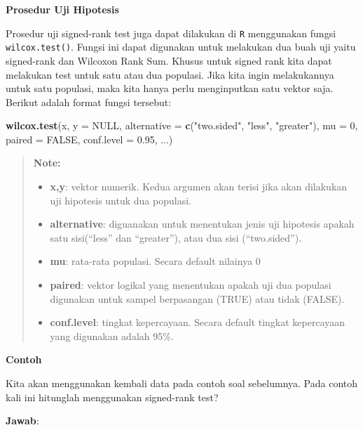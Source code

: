 \documentclass[]{book}
\newenvironment{Shaded}{\begin{snugshade}}{\end{snugshade}}
\newcommand{\KeywordTok}[1]{\textcolor[rgb]{0.13,0.29,0.53}{\textbf{#1}}}
\newcommand{\DataTypeTok}[1]{\textcolor[rgb]{0.13,0.29,0.53}{#1}}
\newcommand{\DecValTok}[1]{\textcolor[rgb]{0.00,0.00,0.81}{#1}}
\newcommand{\FloatTok}[1]{\textcolor[rgb]{0.00,0.00,0.81}{#1}}
\newcommand{\StringTok}[1]{\textcolor[rgb]{0.31,0.60,0.02}{#1}}
\newcommand{\OtherTok}[1]{\textcolor[rgb]{0.56,0.35,0.01}{#1}}
\newcommand{\NormalTok}[1]{#1}
\providecommand{\tightlist}{%
  \setlength{\itemsep}{0pt}\setlength{\parskip}{0pt}}
\begin{document}
\textbf{Prosedur Uji Hipotesis}

Prosedur uji signed-rank test juga dapat dilakukan di \texttt{R}
menggunakan fungsi \texttt{wilcox.test()}. Fungsi ini dapat digunakan
untuk melakukan dua buah uji yaitu signed-rank dan Wilcoxon Rank Sum.
Khusus untuk signed rank kita dapat melakukan test untuk satu atau dua
populasi. Jika kita ingin melakukannya untuk satu populasi, maka kita
hanya perlu menginputkan satu vektor saja. Berikut adalah format fungsi
tersebut:

\begin{Shaded}
\begin{Highlighting}[]
\KeywordTok{wilcox.test}\NormalTok{(x, }\DataTypeTok{y =} \OtherTok{NULL}\NormalTok{,}
            \DataTypeTok{alternative =} \KeywordTok{c}\NormalTok{(}\StringTok{"two.sided"}\NormalTok{, }\StringTok{"less"}\NormalTok{, }\StringTok{"greater"}\NormalTok{),}
            \DataTypeTok{mu =} \DecValTok{0}\NormalTok{, }\DataTypeTok{paired =} \OtherTok{FALSE}\NormalTok{, }\DataTypeTok{conf.level =} \FloatTok{0.95}\NormalTok{, ...)}
\end{Highlighting}
\end{Shaded}

\begin{quote}
\textbf{Note: }

\begin{itemize}
\tightlist
\item
  \textbf{x,y}: vektor numerik. Kedua argumen akan terisi jika akan
  dilakukan uji hipotesis untuk dua populasi.
\item
  \textbf{alternative}: diguanakan untuk menentukan jenis uji hipotesis
  apakah satu sisi(``less'' dan ``greater''), atau dua sisi
  (``two.sided'').
\item
  \textbf{mu}: rata-rata populasi. Secara default nilainya 0
\item
  \textbf{paired}: vektor logikal yang menentukan apakah uji dua
  populasi digunakan untuk sampel berpasangan (TRUE) atau tidak (FALSE).
\item
  \textbf{conf.level}: tingkat kepercayaan. Secara default tingkat
  kepercayaan yang digunakan adalah 95\%.
\end{itemize}
\end{quote}

\textbf{Contoh}

Kita akan menggunakan kembali data pada contoh soal sebelumnya. Pada
contoh kali ini hitunglah menggunakan signed-rank test?

\textbf{Jawab}:
\end{document}
